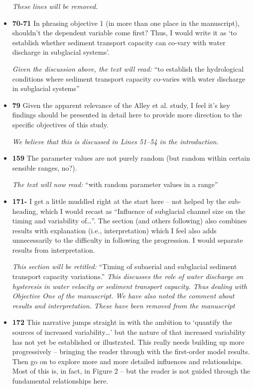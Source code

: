 \documentclass[11pt]{article}
\begin{document}
\begin{itemize}
  \textit{These lines will be removed.}

\item \textbf{70-71} In phrasing objective 1 (in more than one place in the manuscript),
  shouldn’t the dependent variable come first? Thus, I would write it as ‘to
  establish whether sediment transport capacity can co-vary with water
  discharge in subglacial systems’.

  \textit{Given the discussion above, the text will read:} ``to establish the hydrological conditions where  sediment transport capacity co-varies with water discharge in subglacial systems''
  
\item \textbf{79} Given the apparent relevance of the Alley et al. study, I feel it’s key findings
  should be presented in detail here to provide more direction to the specific
  objectives of this study.

  \textit{We believe that this is discussed in Lines 51--54 in the introduction.}


  
\item \textbf{159} The parameter values are not purely random (but random within certain
  sensible ranges, no?).

  \textit{The text will now read:} ``with random parameter values in a range''

\item \textbf{171-} I get a little muddled right at the start here – not helped by the sub-heading,
  which I would recast as “Influence of subglacial channel size on the timing
  and variability of…”. The section (and others following) also combines
  results with explanation (i.e., interpretation) which I feel also adds
  unnecessarily to the difficulty in following the progression. I would separate
  results from interpretation.

  \textit{This section will be retitled:} ``Timing of subaerial and subglacial sediment transport capacity variations.''
  \textit{This discusses the role of water discharge on hysteresis in water velocity or sediment transport capacity. Thus dealing with Objective One of the manuscript. We have also noted the comment about results and interpretation. These have been removed from the manuscript}
  

\item \textbf{172} This narrative jumps straight in with the ambition to ‘quantify the sources
  of increased variability…’ but the nature of that increased variability has not
  yet be established or illustrated. This really needs building up more
  progressively – bringing the reader through with the first-order model
  results. Then go on to explore more and more detailed influences and
  relationships. Most of this is, in fact, in Figure 2 – but the reader is not
  guided through the fundamental relationships here.


\end{itemize}
\end{document}
